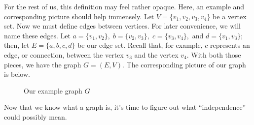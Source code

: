 \documentclass[12pt,oneside]{../../sfsuthesis}
\begin{document}
For the rest of us, this definition may feel rather opaque.
Here, an example and corresponding picture should help immensely.
Let \( V = \{ v_1, v_2, v_3, v_4 \} \) be a vertex set.
Now we must define edges between vertices.
For later convenience, we will name these edges.
Let \( a = \{ v_1, v_2 \}, \; b = \{v_2,v_3\},\; c = \{ v_3, v_4 \},\) and \( d = \{ v_1, v_3 \} \);
then, let \( E = \{ a, b, c, d \} \) be our edge set.
Recall that, for example,  \( c \) represents an edge, or connection, between the vertex \( v_3 \) and the vertex \( v_4 \).
With both those pieces, we have the graph \( G = (E, V) \).
The corresponding picture of our graph is below.

\begin{figure}[H]\label{fig:simpleGraph}
    \centering

    \caption{Our example graph \( G \)}

\end{figure}

Now that we know what a graph is, it's time to figure out what ``independence'' could possibly mean.
\end{document}
